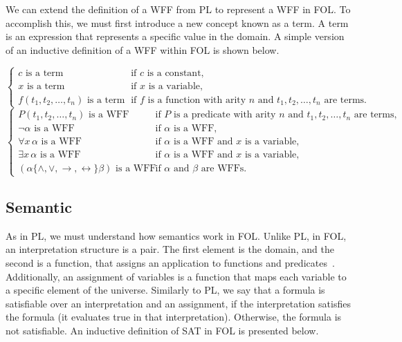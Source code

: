 \vspace{4cm} 
We can extend the definition of a \gls{WFF} from \gls{PL} to represent a \gls{WFF} in \gls{FOL}. To accomplish this, we must first introduce a new concept known as a term. A term is an expression that represents a specific value in the domain. A simple version of an inductive definition of a \gls{WFF} within \gls{FOL} is shown below. 


    \[
    \left\{
    \begin{array}{ll}
    c \text{ is a term} & \text{if } c \text{ is a constant,} \\
    x \text{ is a term} & \text{if } x \text{ is a variable,} \\
    f(t_1, t_2, \dots, t_n) \text{ is a term} & \text{if } f \text{ is a function with arity } n \text{ and } t_1, t_2, \dots, t_n \text{ are terms.}
    \end{array}
    \right.
    \]
    \[
    \left\{
    \begin{array}{ll}
    P(t_1, t_2, \dots, t_n) \text{ is a WFF} & \text{if } P \text{ is a predicate with arity } n \text{ and } t_1, t_2, \dots, t_n \text{ are terms,} \\
    \neg \alpha \text{ is a WFF} & \text{if } \alpha \text{ is a WFF,} \\
    \forall x \, \alpha \text{ is a WFF} & \text{if } \alpha \text{ is a WFF and } x \text{ is a variable,} \\
    \exists x \, \alpha \text{ is a WFF} & \text{if } \alpha \text{ is a WFF and } x \text{ is a variable,} \\
    (\alpha \mathbin{\{\land, \lor, \rightarrow, \leftrightarrow\}} \beta) \text{ is a WFF} & \text{if } \alpha \text{ and } \beta \text{ are WFFs.}
    \end{array}
    \right.
    \]

\subsection{Semantic}
As in \gls{PL}, we must understand how semantics work in \gls{FOL}. Unlike \gls{PL}, in \gls{FOL}, an interpretation structure is a pair. The first element is the domain, and the second is a function, that assigns an application to functions and predicates~\cite{huth_2004_logic}. Additionally, an assignment of variables is a function that maps each variable to a specific element of the universe. Similarly to \gls{PL}, we say that a formula is satisfiable over an interpretation and an assignment, if the interpretation satisfies the formula (it evaluates true in that interpretation). Otherwise, the formula is not satisfiable. An inductive definition of SAT in \gls{FOL} is presented below.

